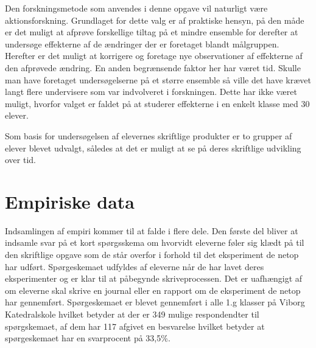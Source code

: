 Den forskningsmetode som anvendes i denne opgave vil naturligt være aktionsforskning. Grundlaget for dette valg er af praktiske hensyn, på den måde er det muligt at afprøve forskellige tiltag på et mindre ensemble for derefter at undersøge effekterne af de ændringer der er foretaget blandt målgruppen. Herefter er det muligt at korrigere og foretage nye observationer af effekterne af den afprøvede ændring. En anden begrænsende faktor her har været tid. Skulle man have foretaget undersøgelserne på et større ensemble så ville det have krævet langt flere undervisere som var indvolveret i forskningen. Dette har ikke været muligt, hvorfor valget er faldet på at studerer effekterne i en enkelt klasse med 30 elever.


Som basis for undersøgelsen af elevernes skriftlige produkter er to grupper af elever blevet udvalgt, således at det er muligt at se på deres skriftlige udvikling over tid. 

\section{Empiriske data}
\label{sec:3.2}

Indsamlingen af empiri kommer til at falde i flere dele. Den første del bliver at indsamle svar på et kort spørgsskema om hvorvidt eleverne føler sig klædt på til den skriftlige opgave som de står overfor i forhold til det eksperiment de netop har udført. Spørgeskemaet udfyldes af eleverne når de har lavet deres eksperimenter og er klar til at påbegynde skriveprocessen. Det er uafhængigt af om eleverne skal skrive en journal eller en rapport om de eksperiment de netop har gennemført. 
Spørgeskemaet er blevet gennemført i alle 1.g klasser på Viborg Katedralskole hvilket betyder at der er 349 mulige respondendter til spørgskemaet, af dem har 117 afgivet en besvarelse hvilket betyder at spørgeskemaet har en svarprocent på 33,5\%. 

